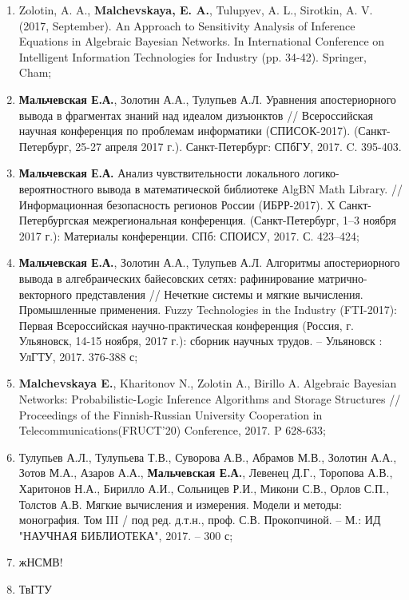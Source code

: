 \begin{enumerate}
        \item	Zolotin, A. A., \textbf{Malchevskaya, E. A.}, Tulupyev, A. L., Sirotkin, A. V. (2017, September). An Approach to Sensitivity Analysis of Inference Equations in Algebraic Bayesian Networks. In International Conference on Intelligent Information Technologies for Industry (pp. 34-42). Springer, Cham;
        \item	\textbf{Мальчевская Е.А.}, Золотин А.А., Тулупьев А.Л. Уравнения апостериорного вывода в фрагментах знаний над идеалом дизъюнктов // Всероссийская научная конференция по проблемам информатики (СПИСОК-2017). (Санкт-Петербург, 25-27 апреля 2017 г.). Санкт-Петербург: СПбГУ, 2017. C. 395-403.
        \item	\textbf{Мальчевская Е.А.} Анализ чувствительности локального логико-вероятностного вывода в математической библиотеке AlgBN Math Library. // Информационная безопасность регионов России (ИБРР-2017). X Санкт-Петербургская межрегиональная конференция. (Санкт-Петербург, 1–3 ноября 2017 г.): Материалы конференции. СПб: СПОИСУ, 2017. С. 423–424;
        \item \textbf{Мальчевская Е.А.}, Золотин А.А., Тулупьев А.Л. Алгоритмы апостериорного вывода в алгебраических байесовских сетях: рафинирование матрично-векторного представления // Нечеткие системы и мягкие вычисления. Промышленные применения. Fuzzy Technologies in the Industry (FTI-2017): Первая Всероссийская научно-практическая конференция (Россия, г. Ульяновск, 14-15 ноября, 2017 г.): сборник научных трудов. – Ульяновск : УлГТУ, 2017. 376-388 с;
        \item	\textbf{Malchevskaya E.}, Kharitonov N., Zolotin A., Birillo A. Algebraic Bayesian Networks: Probabilistic-Logic Inference Algorithms and Storage Structures // Proceedings of the Finnish-Russian University Cooperation in Telecommunications(FRUCT’20) Conference, 2017. P 628-633;
        \item	Тулупьев А.Л., Тулупьева Т.В., Суворова А.В., Абрамов М.В., Золотин А.А., Зотов М.А., Азаров А.А.,\textbf{ Мальчевская Е.А.}, Левенец Д.Г., Торопова А.В., Харитонов Н.А., Бирилло А.И., Сольницев Р.И., Микони С.В., Орлов С.П., Толстов А.В. Мягкие вычисления и измерения. Модели и методы: монография. Том III / под ред. д.т.н., проф. С.В. Прокопчиной. – М.: ИД "НАУЧНАЯ БИБЛИОТЕКА", 2017. – 300 с;
        \item	жНСМВ!
        \item	ТвГТУ
        \end{enumerate}
    
